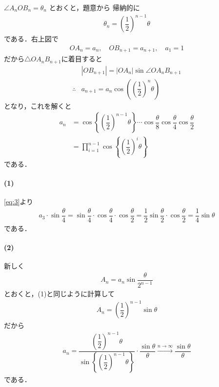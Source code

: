 \documentclass[../../main.tex]{subfiles}
\begin{document}
$\angle A_n O B_n = \theta_n$ とおくと，題意から
帰納的に
\begin{align}
  \theta_n = \left(\dfrac{1}{2}\right)^{n-1} \theta \label{eq:1}
\end{align}
である．右上図で
\begin{align}
  OA_n = a_n, \quad
  OB_{n+1} = a_{n+1}, \quad
  a_1 = 1 \label{eq:2}
\end{align}
だから$\triangle OA_nB_{n+1}$に着目すると
\begin{align}
  & |OB_{n+1}| = |OA_n|\sin\angle OA_nB_{n+1} \\
  \therefore
  & a_{n+1} = a_n \cos\left(\left(\dfrac{1}{2}\right)^n \theta\right)
\end{align}
となり，これを解くと
\begin{align}
  a_n
  &= \cos\left\{ \left(\dfrac{1}{2}\right)^{n-1} \theta \right\} \cdots \cos\dfrac{\theta}{8} \cos\dfrac{\theta}{4} \cos\dfrac{\theta}{2} \\
  &= \prod_{i=1}^{n-1}\cos\left\{ \left(\dfrac{1}{2}\right)^{i}\theta\right\} \label{eq:3}
\end{align}
である．

\paragraph{(1)}

\cref{eq:3}より
\begin{align}
  a_3 \cdot \sin\dfrac{\theta}{4}
  = \sin\dfrac{\theta}{4} \cdot \cos\dfrac{\theta}{4} \cdot \cos\dfrac{\theta}{2}
  = \dfrac{1}{2} \sin\dfrac{\theta}{2} \cdot \cos\dfrac{\theta}{2}
  = \dfrac{1}{4} \sin\theta
\end{align}
である．

\paragraph{(2)}

新しく
\begin{align}
  A_n = a_n \sin\dfrac{\theta}{2^{n-1}}
\end{align}
とおくと，(1)と同じように計算して
\begin{align}
  A_n = \left(\dfrac{1}{2}\right)^{n-1} \sin\theta
\end{align}
だから
\begin{align}
  a_n
  = \dfrac{ \left(\dfrac{1}{2}\right)^{n-1} \theta }{ \sin\left\{ \left(\dfrac{1}{2}\right)^{n-1} \theta \right\} } \cdot \dfrac{\sin\theta}{\theta}
  \xrightarrow{n \to \infty} \dfrac{\sin\theta}{\theta}
\end{align}
である．
\end{document}
